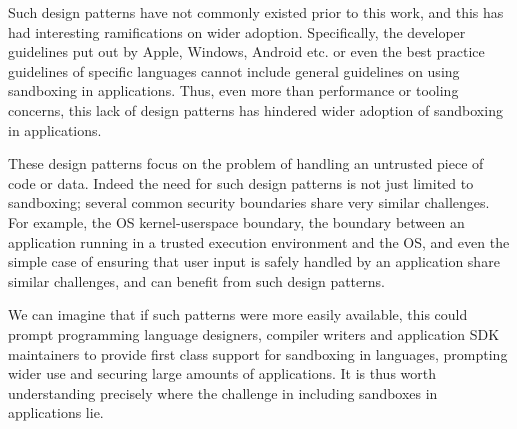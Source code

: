 Such design patterns have not commonly existed prior to this work, and this has 
had interesting ramifications on wider adoption.
%
Specifically, the developer guidelines put out by Apple, Windows, Android etc. 
or even the best practice guidelines of specific languages cannot include 
general guidelines on using sandboxing in applications.
%
Thus, even more than performance or tooling concerns, this lack of design 
patterns has hindered wider adoption of sandboxing in applications.

These design patterns focus on the problem of handling an untrusted piece of 
code or data.
%
Indeed the need for such design patterns is not just limited to sandboxing; 
several common security boundaries share very similar challenges. 
%
For example, the OS kernel-userspace boundary, the boundary between an 
application running in a trusted execution environment and the OS, and even the 
simple case of ensuring that user input is safely handled by an application 
share similar challenges, and can benefit from such design patterns.

We can imagine that if such patterns were more easily available, this could 
prompt programming language designers, compiler writers and application SDK 
maintainers to provide first class support for sandboxing in languages, 
prompting wider use and securing large amounts of applications.
%
It is thus worth understanding precisely where the challenge in including 
sandboxes in applications lie.